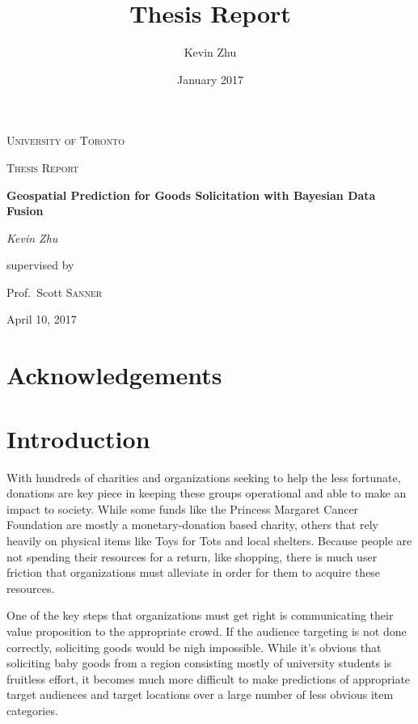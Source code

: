 \documentclass[12pt]{article}
\title{Thesis Report}
\date{January 2017}
\author{Kevin Zhu}
\begin{document}
\begin{titlepage}
   \centering
   {\scshape\LARGE University of Toronto \par}
   \vspace{1cm}
   {\scshape\Large Thesis Report\par}
   \vspace{1.5cm}
   {\huge\bfseries Geospatial Prediction for Goods Solicitation with Bayesian Data Fusion\par}
   \vspace{2cm}
   {\Large\itshape Kevin Zhu\par}
   \vfill
   supervised by\par
   Prof.~Scott \textsc{Sanner}
   \vfill
   {\large April 10, 2017\par}
\end{titlepage}

\newpage
\tableofcontents

\newpage

\section{Acknowledgements}


\section{Introduction}

With hundreds of charities and organizations seeking to help the less fortunate, donations are key piece in keeping these groups operational and able to make an impact to society. While some funds like the Princess Margaret Cancer Foundation are mostly a monetary-donation based charity, others that rely heavily on physical items like Toys for Tots and local shelters. Because people are not spending their resources for a return, like shopping, there is much user friction that organizations must alleviate in order for them to acquire these resources. 

One of the key steps that organizations must get right is communicating their value proposition to the appropriate crowd. If the audience targeting is not done correctly, soliciting goods would be nigh impossible. While it's obvious that soliciting baby goods from a region consisting mostly of university students is fruitless effort, it becomes much more difficult to make predictions of appropriate target audiences and target locations over a large number of less obvious item categories. 
\end{document}
